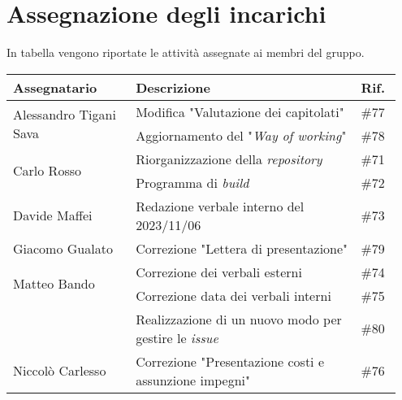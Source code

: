 \section{Assegnazione degli incarichi}
In tabella vengono riportate le attività assegnate ai membri del gruppo.
\begin{center}
	{
		\renewcommand{\arraystretch}{1.5}
		\begin{tabular}{p{0.30\linewidth}|p{0.55\linewidth}|p{0.10\linewidth}}
			\textbf{Assegnatario}                   & \textbf{Descrizione}                                         & \textbf{Rif.} \\
			\hline
			\multirow{2}{*}{Alessandro Tigani Sava} & Modifica "Valutazione dei capitolati"                        & \#77          \\
			\cline{2-3}
			                                        & Aggiornamento del "\textit{Way of working}"                  & \#78          \\  
			\hline
			\multirow{2}{*}{Carlo Rosso}            & Riorganizzazione della \textit{repository}                   & \#71          \\
			\cline{2-3}
			                                        & Programma di \textit{build}                                  & \#72          \\
			\hline
			Davide Maffei                           & Redazione verbale interno del 2023/11/06                     & \#73          \\
			\hline
			Giacomo Gualato					
			                                        & Correzione "Lettera di presentazione"                        & \#79          \\
			\hline
			\multirow{2}{*}{Matteo Bando}           & Correzione dei verbali esterni                               & \#74          \\
			\cline{2-3}
			                                        & Correzione data dei verbali interni                          & \#75          \\
			\cline{2-3}
			                                        & Realizzazione di un nuovo modo per gestire le \textit{issue} & \#80          \\
			\hline
			Niccolò Carlesso				
			                                        & Correzione "Presentazione costi e assunzione impegni"        & \#76          \\
		\end{tabular}
	}
\end{center}
